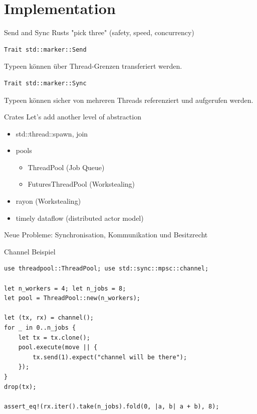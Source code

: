 \documentclass[aspectratio=1610,t]{beamer}
\begin{document}
{
\section{Implementation}
}

\begin{frame}[fragile]{Send and Sync}
Rusts "pick three" (safety, speed, concurrency)

\begin{verbatim}
Trait std::marker::Send
\end{verbatim}
Typeen können über Thread-Grenzen transferiert werden.

\begin{verbatim}
Trait std::marker::Sync
\end{verbatim}
Typeen können sicher von mehreren Threads referenziert und aufgerufen werden.

\end{frame}

\begin{frame}[fragile]{Crates}
Let's add another level of abstraction
\begin{itemize}
  \item std::thread::{spawn, join}
  \item pools \begin{itemize}
      \item ThreadPool (Job Queue)
      \item FuturesThreadPool (Workstealing)
    \end{itemize}
  \item rayon (Workstealing)
  \item timely dataflow (distributed actor model)
\end{itemize}

Neue Probleme: Synchronisation, Kommunikation und Besitzrecht

\end{frame}

\begin{frame}[fragile]{Channel Beispiel}
\begin{verbatim}
use threadpool::ThreadPool; use std::sync::mpsc::channel;

let n_workers = 4; let n_jobs = 8;
let pool = ThreadPool::new(n_workers);

let (tx, rx) = channel();
for _ in 0..n_jobs {
    let tx = tx.clone();
    pool.execute(move || {
        tx.send(1).expect("channel will be there");
    });
}
drop(tx);

assert_eq!(rx.iter().take(n_jobs).fold(0, |a, b| a + b), 8);
\end{verbatim}
\end{frame}
\end{document}

